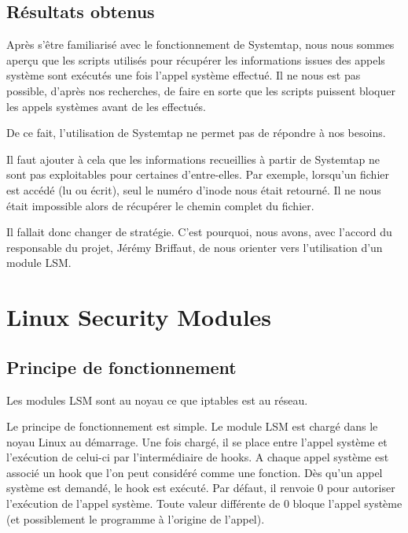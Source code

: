 \documentclass[pdftex,a4paper,titlepage,11pt,openright]{article}
\begin{document}
\subsection{Résultats obtenus}

Après s'être familiarisé avec le fonctionnement de Systemtap, nous nous sommes aperçu que les scripts utilisés pour récupérer les informations issues des appels système sont exécutés une fois l'appel système effectué. Il ne nous est pas possible, d'après nos recherches, de faire en sorte que les scripts puissent bloquer les appels systèmes avant de les effectués.

De ce fait, l'utilisation de Systemtap ne permet pas de répondre à nos besoins.

Il faut ajouter à cela que les informations recueillies à partir de Systemtap ne sont pas exploitables pour certaines d'entre-elles. Par exemple, lorsqu'un fichier est accédé (lu ou écrit), seul le numéro d'inode nous était retourné. Il ne nous était impossible alors de récupérer le chemin complet du fichier.

Il fallait donc changer de stratégie. C'est pourquoi, nous avons, avec l'accord du responsable du projet, Jérémy Briffaut, de nous orienter vers l'utilisation d'un module LSM.



\newpage


\section{Linux Security Modules}



\subsection{Principe de fonctionnement}

Les modules LSM sont au noyau ce que iptables est au réseau. 

Le principe de fonctionnement est simple. Le module LSM est chargé dans le noyau Linux au démarrage. Une fois chargé, il se place entre l'appel système et l'exécution de celui-ci par l'intermédiaire de hooks. A chaque appel système est associé un hook que l'on peut considéré comme une fonction. Dès qu'un appel système est demandé, le hook est exécuté. Par défaut, il renvoie 0 pour autoriser l'exécution de l'appel système. Toute valeur différente de 0 bloque l'appel système (et possiblement le programme à l'origine de l'appel).
\end{document}
